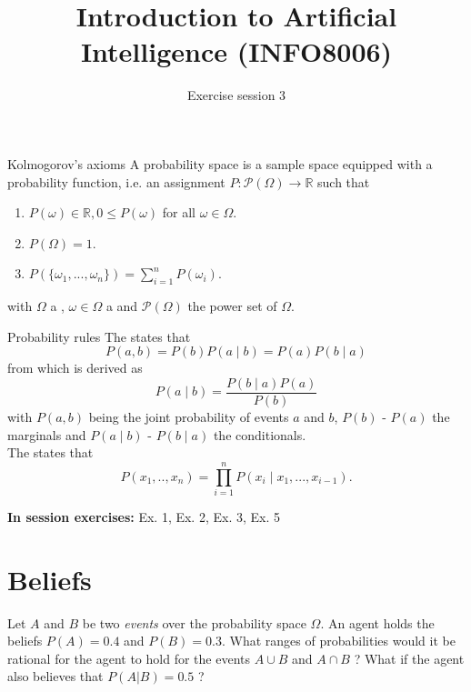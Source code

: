 \documentclass[11pt, a4paper]{article}
\title{Introduction to Artificial Intelligence (INFO8006)}
\subtitle{Exercise session 3}
\begin{document}
\maketitle

\begin{thbox}{Kolmogorov's axioms}
    A probability space is a sample space equipped with a probability function, i.e.
an assignment $P : \mathcal{P}(\Omega) \rightarrow \mathbb{R}$ such that
\begin{enumerate}
    \item $P(\omega) \in \mathbb{R}, 0 \leq P(\omega)$ for all $\omega \in \Omega$.
    \item $P(\Omega) = 1$.
    \item $P(\{\omega_1, ..., \omega_n\}) = \sum_{i=1}^n P(\omega_i)$.
\end{enumerate}
with $\Omega$ a , $\omega \in \Omega$ a  and $\mathcal{P}(\Omega)$ the power set of $\Omega$.
\end{thbox}

\begin{thbox}{Probability rules}
    The  states that
    $$
    P(a,b) = P(b)P(a\mid b) = P(a)P(b\mid a)
    $$ 
    from which  is derived as
    $$
    P(a\mid b) = \dfrac{P(b\mid a)P(a)}{P(b)}
    $$
    with $P(a,b)$ being the joint probability of events $a$ and $b$, $P(b)$ - $P(a)$ the marginals and $P(a\mid b)$ - $P(b\mid a)$ the conditionals.\\

    The  states that 
    $$
    P(x_1,..,x_n) = \prod_{i=1}^n P(x_i\mid x_1, ..., x_{i-1}). 
    $$
\end{thbox}

\textbf{In session exercises:} Ex. 1, Ex. 2, Ex. 3, Ex. 5 

\newpage

\section{Beliefs}

Let $A$ and $B$ be two \emph{events} over the probability space $\Omega$. An agent holds the beliefs $P(A) = 0.4$ and $P(B) = 0.3$. What ranges of probabilities would it be rational for the agent to hold for the events $A \cup B$ and $A \cap B$ ? What if the agent also believes that $P(A | B) = 0.5$ ?
\end{document}
